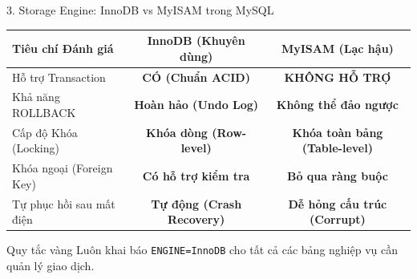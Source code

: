 \documentclass[aspectratio=169,11pt]{beamer}
\newcommand{\code}[1]{\texttt{#1}}
\begin{document}
\begin{frame}{3. Storage Engine: InnoDB vs MyISAM trong MySQL}
  \begin{table}
    \centering
    \small
    \begin{tabularx}{0.92\textwidth}{l c c}
      \toprule
      \textbf{Tiêu chí Đánh giá} & \textbf{InnoDB (Khuyên dùng)} & \textbf{MyISAM (Lạc hậu)} \\
      \midrule
      Hỗ trợ Transaction & \textcolor{dbgreen}{\textbf{CÓ (Chuẩn ACID)}} & \textcolor{dbred}{\textbf{KHÔNG HỖ TRỢ}} \\
      Khả năng ROLLBACK & \textcolor{dbgreen}{\textbf{Hoàn hảo (Undo Log)}} & \textcolor{dbred}{\textbf{Không thể đảo ngược}} \\
      Cấp độ Khóa (Locking) & \textbf{Khóa dòng (Row-level)} & \textbf{Khóa toàn bảng (Table-level)} \\
      Khóa ngoại (Foreign Key) & \textcolor{dbgreen}{\textbf{Có hỗ trợ kiểm tra}} & \textcolor{dbred}{\textbf{Bỏ qua ràng buộc}} \\
      Tự phục hồi sau mất điện & \textbf{Tự động (Crash Recovery)} & \textbf{Dễ hỏng cấu trúc (Corrupt)} \\
      \bottomrule
    \end{tabularx}
  \end{table}
  \begin{alertblock}{Quy tắc vàng}
    Luôn khai báo \code{ENGINE=InnoDB} cho tất cả các bảng nghiệp vụ cần quản lý giao dịch.
  \end{alertblock}
\end{frame}
\end{document}
